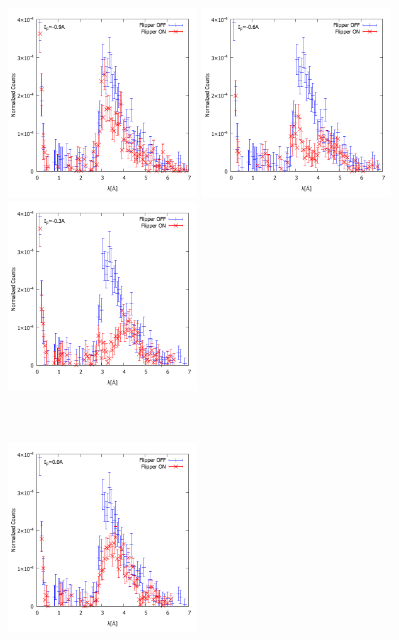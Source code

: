 \begin{figure}[h]
\begin{minipage}{0.33\hsize}
\includegraphics[width=5cm]{discussion/NC-BG/NormalizedCounts_b_-9A.pdf}
\end{minipage}
\begin{minipage}{0.33\hsize}
\includegraphics[width=5cm]{discussion/NC-BG/NormalizedCounts_b_-6A.pdf}
\end{minipage}
\begin{minipage}{0.33\hsize}
\includegraphics[width=5cm]{discussion/NC-BG/NormalizedCounts_b_-3A.pdf}
\end{minipage}\\
\begin{minipage}{0.33\hsize}
\includegraphics[width=5cm]{discussion/NC-BG/NormalizedCounts_b_0A.pdf}

\end{minipage}
\end{figure}
